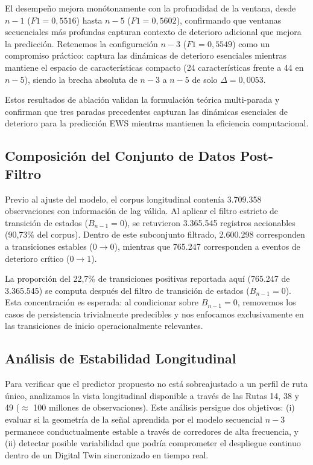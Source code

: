 \documentclass[fleqn,10pt,lineno]{wlpeerj}
\begin{document}
El desempe\~no mejora mon\'otonamente con la profundidad de la ventana, desde $n{-}1$ ($F1=0,5516$) hasta $n{-}5$ ($F1=0,5602$), confirmando que ventanas secuenciales m\'as profundas capturan contexto de deterioro adicional que mejora la predicci\'on. Retenemos la configuraci\'on $n{-}3$ ($F1=0,5549$) como un compromiso pr\'actico: captura las din\'amicas de deterioro esenciales mientras mantiene el espacio de caracter\'isticas compacto (24 caracter\'isticas frente a 44 en $n{-}5$), siendo la brecha absoluta de $n{-}3$ a $n{-}5$ de solo $\Delta=0,0053$.

Estos resultados de ablaci\'on validan la formulaci\'on te\'orica multi-parada y confirman que tres paradas precedentes capturan las din\'amicas esenciales de deterioro para la predicci\'on EWS mientras mantienen la eficiencia computacional.

\subsection{Composici\'on del Conjunto de Datos Post-Filtro}
\label{sec:composicion}

Previo al ajuste del modelo, el corpus longitudinal conten\'ia 3.709.358 observaciones con informaci\'on de lag v\'alida. Al aplicar el filtro estricto de transici\'on de estados ($B_{n-1}=0$), se retuvieron 3.365.545 registros accionables (90,73\% del corpus). Dentro de este subconjunto filtrado, 2.600.298 corresponden a transiciones estables ($0 \rightarrow 0$), mientras que 765.247 corresponden a eventos de deterioro cr\'itico ($0 \rightarrow 1$).

La proporci\'on del 22,7\% de transiciones positivas reportada aqu\'i (765.247 de 3.365.545) se computa despu\'es del filtro de transici\'on de estados ($B_{n-1}=0$). Esta concentraci\'on es esperada: al condicionar sobre $B_{n-1}=0$, removemos los casos de persistencia trivialmente predecibles y nos enfocamos exclusivamente en las transiciones de inicio operacionalmente relevantes.

\subsection{An\'alisis de Estabilidad Longitudinal}

Para verificar que el predictor propuesto no est\'a sobreajustado a un perfil de ruta \'unico, analizamos la vista longitudinal disponible a trav\'es de las Rutas 14, 38 y 49 ($\approx$ 100 millones de observaciones). Este an\'alisis persigue dos objetivos: (i) evaluar si la geometr\'ia de la se\~nal aprendida por el modelo secuencial $n{-}3$ permanece conductualmente estable a trav\'es de corredores de alta frecuencia, y (ii) detectar posible variabilidad que podr\'ia comprometer el despliegue continuo dentro de un Digital Twin sincronizado en tiempo real.
\end{document}
